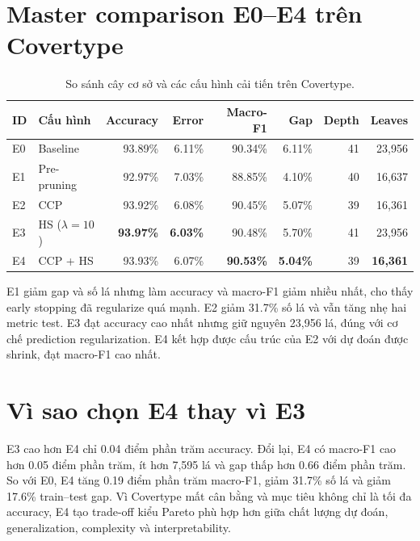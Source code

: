 \section{Master comparison E0--E4 trên Covertype}

\begin{table}[H]
    \centering
    \footnotesize
    \caption[So sánh E0--E4 trên Covertype]{So sánh cây cơ sở và các cấu hình cải tiến trên Covertype.}
    \label{tab:improvement-master}
    \begin{tabular*}{\textwidth}{@{\extracolsep{\fill}}llrrrrrr@{}}
        \toprule
        \textbf{ID} & \textbf{Cấu hình} & \textbf{Accuracy} & \textbf{Error} & \textbf{Macro-F1} & \textbf{Gap} & \textbf{Depth} & \textbf{Leaves} \\
        \midrule
        E0 & Baseline & 93.89\% & 6.11\% & 90.34\% & 6.11\% & 41 & 23,956 \\
        E1 & Pre-pruning & 92.97\% & 7.03\% & 88.85\% & 4.10\% & 40 & 16,637 \\
        E2 & CCP & 93.92\% & 6.08\% & 90.45\% & 5.07\% & 39 & 16,361 \\
        E3 & HS ($\lambda=10$) & \textbf{93.97\%} & \textbf{6.03\%} & 90.48\% & 5.70\% & 41 & 23,956 \\
        E4 & CCP + HS & 93.93\% & 6.07\% & \textbf{90.53\%} & \textbf{5.04\%} & 39 & \textbf{16,361} \\
        \bottomrule
    \end{tabular*}
\end{table}

E1 giảm gap và số lá nhưng làm accuracy và macro-F1 giảm nhiều nhất, cho thấy early stopping đã regularize quá mạnh. E2 giảm 31.7\% số lá và vẫn tăng nhẹ hai metric test. E3 đạt accuracy cao nhất nhưng giữ nguyên 23,956 lá, đúng với cơ chế prediction regularization. E4 kết hợp được cấu trúc của E2 với dự đoán được shrink, đạt macro-F1 cao nhất.

\section{Vì sao chọn E4 thay vì E3}

E3 cao hơn E4 chỉ 0.04 điểm phần trăm accuracy. Đổi lại, E4 có macro-F1 cao hơn 0.05 điểm phần trăm, ít hơn 7,595 lá và gap thấp hơn 0.66 điểm phần trăm. So với E0, E4 tăng 0.19 điểm phần trăm macro-F1, giảm 31.7\% số lá và giảm 17.6\% train--test gap. Vì Covertype mất cân bằng và mục tiêu không chỉ là tối đa accuracy, E4 tạo trade-off kiểu Pareto phù hợp hơn giữa chất lượng dự đoán, generalization, complexity và interpretability.

